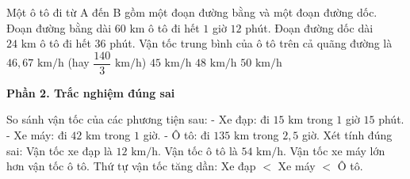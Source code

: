 \begin{ex} %
Một ô tô đi từ A đến B gồm một đoạn đường bằng và một đoạn đường dốc. Đoạn đường bằng dài $60\text{ km}$ ô tô đi hết $1$ giờ $12$ phút. Đoạn đường dốc dài $24\text{ km}$ ô tô đi hết $36$ phút. Vận tốc trung bình của ô tô trên cả quãng đường là
\choice
{\True $46{,}67\text{ km/h}$ (hay $\dfrac{140}{3}\text{ km/h}$)}
{$45\text{ km/h}$}
{$48\text{ km/h}$}
{$50\text{ km/h}$}
\end{ex}

\textbf{Phần 2. Trắc nghiệm đúng sai}

\begin{ex} %
So sánh vận tốc của các phương tiện sau:
- Xe đạp: đi $15\text{ km}$ trong $1$ giờ $15$ phút.
- Xe máy: đi $42\text{ km}$ trong $1$ giờ.
- Ô tô: đi $135\text{ km}$ trong $2{,}5$ giờ.
Xét tính đúng sai:
\choiceTF
{\True Vận tốc xe đạp là $12\text{ km/h}$.}
{\True Vận tốc ô tô là $54\text{ km/h}$.}
{Vận tốc xe máy lớn hơn vận tốc ô tô.}
{\True Thứ tự vận tốc tăng dần: Xe đạp $<$ Xe máy $<$ Ô tô.}
\end{ex}


